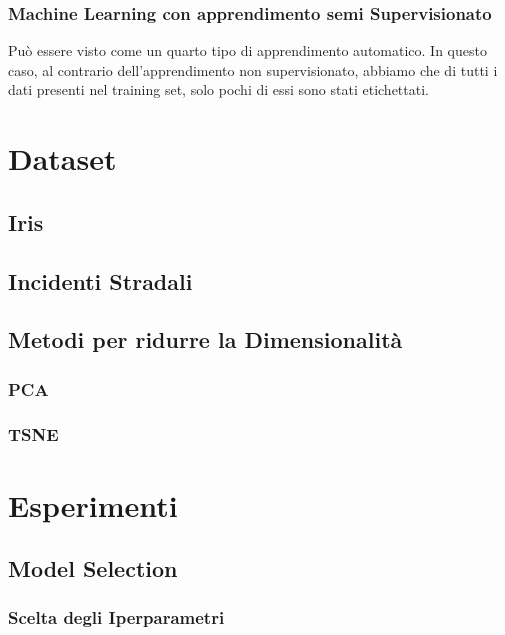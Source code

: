 \documentclass[12pt,italian]{report}
\begin{document}
\subsection{Machine Learning con apprendimento semi Supervisionato}
Può essere visto come un quarto tipo di apprendimento automatico. In questo caso, al contrario dell’apprendimento non supervisionato, abbiamo che di tutti i dati presenti nel training set, solo pochi di essi sono stati etichettati.
% 
% 

\chapter{Dataset}


\section{Iris}


\section{Incidenti Stradali}





\section{Metodi per ridurre la Dimensionalità}



\subsection{PCA}
\subsection{TSNE}


% 
% 

\chapter{Esperimenti}
\label{cap3}



\section{Model Selection}

\subsection{Scelta degli Iperparametri}
\end{document}

